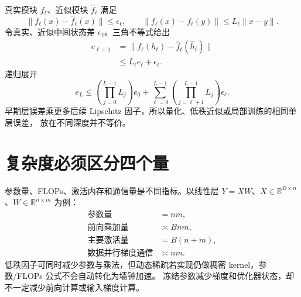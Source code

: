 \documentclass[11pt]{article}
\numberwithin{equation}{section}
\newcommand{\R}{\mathbb{R}}
\newcommand{\1}{\mathbf{1}}
\begin{document}
真实模块 $f_\ell$、近似模块 $\widehat f_\ell$ 满足
\begin{equation}
 \|f_\ell(x)-\widehat f_\ell(x)\|\le\epsilon_\ell,
 \qquad
 \|f_\ell(x)-f_\ell(y)\|\le L_\ell\|x-y\|.
\end{equation}
令真实、近似中间状态差 $e_\ell$。三角不等式给出
\begin{align}
 e_{\ell+1}
 &=\|f_\ell(h_\ell)-\widehat f_\ell(\widehat h_\ell)\|\\
 &\le L_\ell e_\ell+\epsilon_\ell.
\end{align}
递归展开
\begin{equation}
 e_L\le
 \left(\prod_{j=0}^{L-1}L_j\right)e_0
 +\sum_{\ell=0}^{L-1}
 \left(\prod_{j=\ell+1}^{L-1}L_j\right)\epsilon_\ell.
\end{equation}
早期层误差乘更多后续 Lipschitz 因子，所以量化、低秩近似或局部训练的相同单层误差，
放在不同深度并不等价。

\section{复杂度必须区分四个量}

参数量、FLOPs、激活内存和通信量是不同指标。以线性层
$Y=XW$、$X\in\R^{B\times n}$、$W\in\R^{n\times m}$ 为例：
\begin{align}
 \text{参数量}&=nm,\\
 \text{前向乘加量}&\asymp Bnm,\\
 \text{主要激活量}&=B(n+m),\\
 \text{数据并行梯度通信}&\asymp nm.
\end{align}
低秩因子可同时减少参数与乘法，但动态稀疏若实现仍做稠密 kernel，参数/FLOPs 公式不会自动转化为墙钟加速。
冻结参数减少梯度和优化器状态，却不一定减少前向计算或输入梯度计算。
\end{document}

